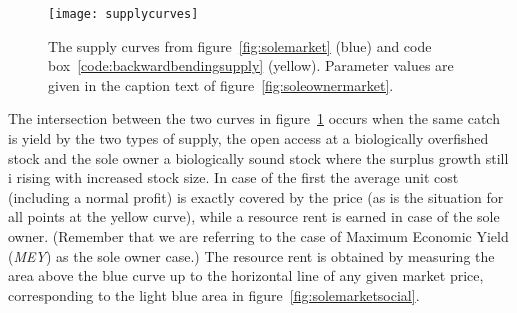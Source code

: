 \documentclass[11pt,fleqn]{book} %
\begin{document}
\begin{figure}[ht]
\centering
\texttt{[image: supplycurves]}
\caption{The supply curves from figure~\ref{fig:solemarket} (blue) and code box~\ref{code:backwardbendingsupply} (yellow). Parameter values are given in the caption text of figure~\ref{fig:soleownermarket}.} 
\label{fig:supplycurves}
\end{figure}

The intersection between the two curves in figure~\ref{fig:supplycurves} occurs when the same catch is yield by the two types of supply, the open access at a biologically overfished stock and the sole owner a biologically sound stock where the surplus growth still i rising with increased stock size. In case of the first the average unit cost (including a normal profit) is exactly covered by the price (as is the situation for all points at the yellow curve), while a resource rent is earned in case of the sole owner. (Remember that we are referring to the case of Maximum Economic Yield (\textit{MEY}) as the sole owner case.) The resource rent is obtained by measuring the area above the blue curve up to the horizontal line of any given market price, corresponding to the light blue area in figure~\ref{fig:solemarketsocial}.

\begin{figure}[!htb]
\end{figure}

\end{document}
